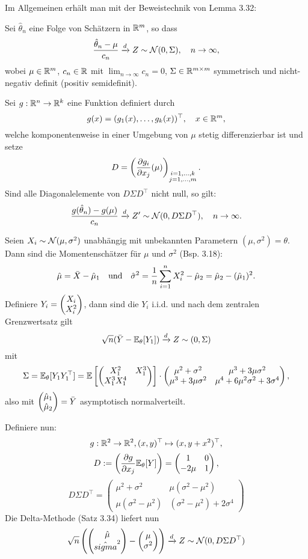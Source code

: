 Im Allgemeinen erhält man mit der Beweistechnik von Lemma 3.32:
\begin{prp}
  Sei $\hat{\theta}_n$ eine Folge von Schätzern in $\mathbb{R}^m$, so dass
  \[ \frac{\hat{\theta}_n - \mu}{c_n} \xrightarrow{d} Z \sim \mathcal{N}(0, \Sigma),
  \quad n \to \infty, \]
  wobei $\mu \in \mathbb{R}^m$, $c_n \in \mathbb{R}$ mit $\lim_{n \to \infty} c_n = 0$,
  $\Sigma \in \mathbb{R}^{m \times m}$ symmetrisch und nicht-negativ definit (positiv
  semidefinit).

  Sei $g : \mathbb{R}^n \to \mathbb{R}^k$ eine Funktion definiert durch
  \[ g(x) = (g_1(x), \ldots, g_k(x))^\top, \quad x \in \mathbb{R}^m, \]
  welche komponentenweise in einer Umgebung von $\mu$ stetig differenzierbar ist
  und setze
  \[ D = \left( \frac{\partial g_i}{\partial x_j}(\mu) \right)_{
      \substack{i=1,\ldots,k \\ j=1,\ldots,m}}. \]
  Sind alle Diagonalelemente von $D \Sigma D^\top$ nicht null, so gilt:
  \[ \frac{g(\hat{\theta}_n) - g(\mu)}{c_n} \xrightarrow{d}
  Z' \sim \mathcal{N}(0, D \Sigma D^\top), \quad n \to \infty. \]
\end{prp}

\begin{exmp}
  Seien $X_i \sim \mathcal{N}(\mu,\sigma^2)$ unabhängig mit unbekannten Parametern
  $(\mu,\sigma^2) = \theta$. Dann sind die Momentenschätzer für $\mu$ und
  $\sigma^2$ (Bsp. 3.18):
  \[ \hat{\mu} = \bar{X} - \hat{\mu}_1 \quad \text{und} \quad
    \hat{\sigma}^2 = \frac{1}{n} \sum_{i=1}^n X_i^2 - \hat{\mu}_2
    = \hat{\mu}_2 - (\hat{\mu}_1)^2. \]
  Definiere $Y_i = \begin{pmatrix}X_i \\ X_i^2\end{pmatrix}$, dann sind die $Y_i$ i.i.d. und nach dem
  zentralen Grenzwertsatz gilt
  \[ \sqrt{n} ( \bar{Y} - \mathbb{E}_\theta[Y_1]) \xrightarrow{d} Z \sim(0,\Sigma) \]
  mit
  \[ \Sigma = \mathbb{E}_\theta[Y_1 Y_1^\top] = \mathbb{E}
    \left[ \begin{pmatrix} X_1^2 & X_1^3 \\ X_1^3 X_1^4\end{pmatrix} \right] \cdot
    \begin{pmatrix}
      \mu^2 + \sigma^2 & \mu^3 + 3 \mu \sigma^2 \\
      \mu^3 + 3 \mu \sigma^2 & \mu^4 + 6 \mu^2 \sigma^2 + 3 \sigma^4
    \end{pmatrix},
  \]
  also mit $\begin{pmatrix}\hat{\mu}_1 \\ \hat{\mu}_2\end{pmatrix} = \bar{Y}$ asymptotisch
  normalverteilt.

  Definiere nun:
  \[ g : \mathbb{R}^2 \to \mathbb{R}^2, (x,y)^\top \mapsto (x, y+x^2)^\top, \]
  \[ D := \left( \frac{\partial g}{\partial x_j} \mathbb{E}_\theta[Y] \right)
    = \begin{pmatrix} 1 & 0 \\ -2 \mu & 1 \end{pmatrix}, \]
  \[ D \Sigma D^\top =
    \begin{pmatrix}
      \mu^2 + \sigma^2 & \mu( \sigma^2 - \mu^2 ) \\
      \mu( \sigma^2 - \mu^2 ) & (\sigma^2 - \mu^2) + 2 \sigma^4
    \end{pmatrix}
  \]
  Die Delta-Methode (Satz 3.34) liefert nun
  \[ \sqrt{n} \left( \begin{pmatrix} \hat{\mu} \\ \hat{sigma}^2\end{pmatrix} -
      \begin{pmatrix}\mu \\ \sigma^2\end{pmatrix} \right)
    \xrightarrow{d} Z \sim \mathcal{N}(0, D \Sigma D^\top )\]
\end{exmp}

